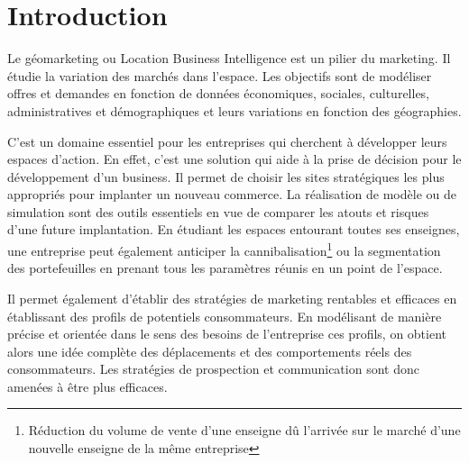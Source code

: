 \documentclass{themeensg}
\begin{document}
  \begin{acronym}
  \end{acronym}


\chapter*{Introduction}

Le géomarketing ou Location Business Intelligence est un pilier du marketing. Il étudie la variation des marchés dans l’espace. Les objectifs sont de modéliser offres et demandes en fonction de données économiques, sociales, culturelles, administratives et démographiques et leurs variations en fonction des géographies.

C’est un domaine essentiel pour les entreprises qui cherchent à développer leurs espaces d’action. En effet, c’est une solution qui aide à la prise de décision pour le développement d’un business. Il permet de choisir les sites stratégiques les plus appropriés pour implanter un nouveau commerce. La réalisation de modèle ou de simulation sont des outils essentiels en vue de comparer les atouts et risques d’une future implantation. En étudiant les espaces entourant toutes ses enseignes, une entreprise peut également anticiper la cannibalisation\footnote{Réduction du volume de vente d'une enseigne dû l'arrivée sur le marché d'une nouvelle enseigne de la même entreprise} ou la segmentation des portefeuilles en prenant tous les paramètres réunis en un point de l’espace.

Il permet également d’établir des stratégies de marketing rentables et efficaces en établissant des profils de potentiels consommateurs. En modélisant de manière précise et orientée dans le sens des besoins de l’entreprise ces profils, on obtient alors une idée complète des déplacements et des comportements réels des consommateurs. Les stratégies de prospection et communication sont donc amenées à être plus efficaces.
\end{document}
